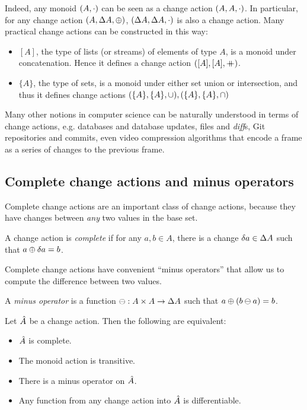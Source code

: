 Indeed, any monoid $(A, \cdot)$ can be seen as a change action $(A,A,\cdot)$. In particular,
for any change action $(A,\Delta A,\oplus)$,
$(\Delta A,\Delta A,\cdot)$ is also a change action. Many practical change actions
can be constructed in this way:
\begin{itemize}
  \item $[A]$, the type of lists (or streams) of elements of type $A$, is a monoid under
  concatenation. Hence it defines a change action $([A],[A],\mathbin{+\mkern-10mu+})$.
  \item $\{A\}$, the type of sets, is a monoid under either set union or intersection,
  and thus it defines change actions $(\{A\},\{A\},\cup),(\{A\},\{A\},\cap)$
\end{itemize}

Many other notions in computer science can be naturally understood in terms of change actions, e.g. databases
and database updates, files and \textit{diff}s, Git repositories and commits, even video compression
algorithms that encode a frame as a series of changes to the previous frame.

\subsection{Complete change actions and minus operators}


Complete change actions are an important class of change actions, because they
have changes between \emph{any} two values in the base set.

\begin{defn}
  A change action is \textit{complete} if for any $a, b \in A$, there is
  a change $\delta a \in \Delta A$ such that $a \oplus \delta a = b$.
\end{defn}

Complete change actions have convenient ``minus operators'' that allow us to
compute the difference between two values.

\begin{defn}
  A \textit{minus operator} is a function $\ominus: A \times A \rightarrow \Delta A$ such that $a \oplus (b \ominus a) = b$.
\end{defn}

\begin{prop}
  Let $\hat{A}$ be a change action. Then the following are equivalent:
  \begin{itemize}
    \item $\hat{A}$ is complete.
    \item The monoid action is transitive.
    \item There is a minus operator on $\hat{A}$.
    \item Any function from any change action into $\hat{A}$ is differentiable.
  \end{itemize}
\end{prop}

